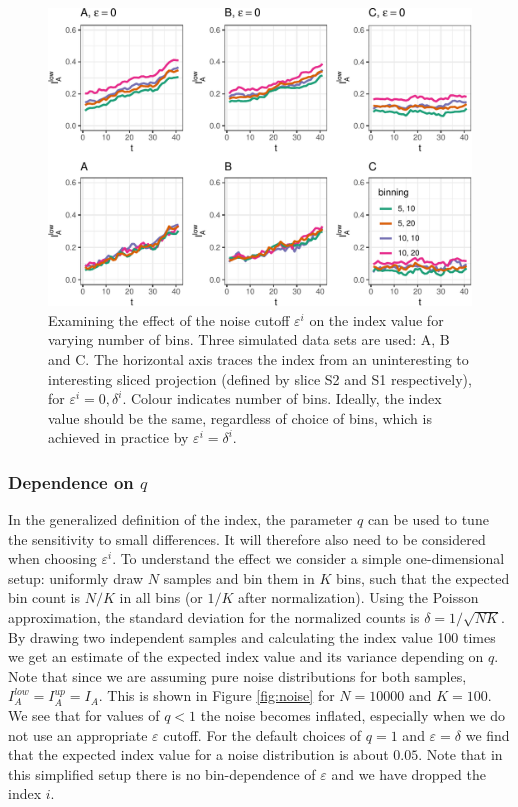 \documentclass[]{interact}
\theoremstyle{plain}%
\theoremstyle{definition}
\theoremstyle{remark}
\begin{document}
\begin{figure}

{\centering \includegraphics[width=0.9\linewidth]{section_pursuit_files/figure-latex/path_eps-1} 

}

\caption{Examining the effect of the noise cutoff $\varepsilon^i$ on the index value for varying number of bins. Three simulated data sets are used:  A, B and C. The horizontal axis traces the index from an uninteresting to interesting sliced projection (defined by slice S2 and S1 respectively), for $\varepsilon^i=0, \delta^i$. Colour indicates number of bins. Ideally, the index value should be the same, regardless of choice of bins, which is achieved in practice by $\varepsilon^i=\delta^i$.}\label{fig:path_eps}
\end{figure}

\hypertarget{dependenceq}{%
\subsubsection*{\texorpdfstring{Dependence on
\(q\)}{Dependence on q}}\label{dependenceq}}

In the generalized definition of the index, the parameter \(q\) can be
used to tune the sensitivity to small differences. It will therefore
also need to be considered when choosing \(\varepsilon^i\). To
understand the effect we consider a simple one-dimensional setup:
uniformly draw \(N\) samples and bin them in \(K\) bins, such that the
expected bin count is \(N/K\) in all bins (or \(1/K\) after
normalization). Using the Poisson approximation, the standard deviation
for the normalized counts is \(\delta=1/\sqrt{N K}\). By drawing two
independent samples and calculating the index value 100 times we get an
estimate of the expected index value and its variance depending on
\(q\). Note that since we are assuming pure noise distributions for both
samples, \(I_A^{low}=I_A^{up}=I_A\). This is shown in Figure
\ref{fig:noise} for \(N=10000\) and \(K=100\). We see that for values of
\(q<1\) the noise becomes inflated, especially when we do not use an
appropriate \(\varepsilon\) cutoff. For the default choices of \(q=1\)
and \(\varepsilon=\delta\) we find that the expected index value for a
noise distribution is about \(0.05\). Note that in this simplified setup
there is no bin-dependence of \(\varepsilon\) and we have dropped the
index \(i\).
\end{document}
